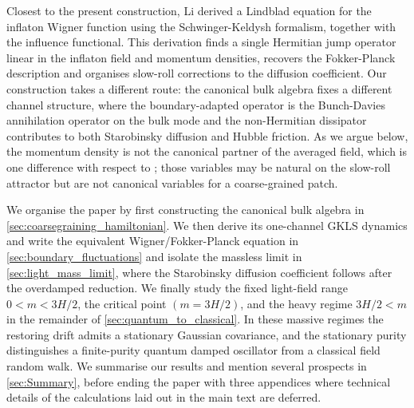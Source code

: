 \documentclass{article}
\numberwithin{equation}{section}
\begin{document}
	
	Closest to the present construction, Li \cite{Li2026Stochastic,Li2026lwl} derived a Lindblad equation for the inflaton Wigner function using the Schwinger-Keldysh formalism, together with the influence functional. This derivation finds a single Hermitian jump operator linear in the inflaton field and momentum densities, recovers the Fokker-Planck description and organises slow-roll corrections to the diffusion coefficient. Our construction takes a different route: the canonical bulk algebra fixes a different channel structure, where the boundary-adapted operator is the Bunch-Davies annihilation operator on the bulk mode and the non-Hermitian dissipator contributes to both Starobinsky diffusion and Hubble friction. As we argue below, the momentum density is not the canonical partner of the averaged field, which is one difference with respect to \cite{Li2026Stochastic,Li2026lwl}; those variables may be natural on the slow-roll attractor but are not canonical variables for a coarse-grained patch.

	We organise the paper by first constructing the canonical bulk algebra in \cref{sec:coarsegraining_hamiltonian}. We then derive its one-channel GKLS dynamics and write the equivalent Wigner/Fokker-Planck equation in \cref{sec:boundary_fluctuations} and isolate the massless limit in \cref{sec:light_mass_limit}, where the Starobinsky diffusion coefficient follows after the overdamped reduction. We finally study the fixed light-field range \(0<m<3H/2\), the critical point $(m=3H/2)$, and the heavy regime \(3H/2<m\) in the remainder of \cref{sec:quantum_to_classical}. In these massive regimes the restoring drift admits a stationary Gaussian covariance, and the stationary purity distinguishes a finite-purity quantum damped oscillator from a classical field random walk. We summarise our results and mention several prospects in \cref{sec:Summary}, before ending the paper with three appendices where technical details of the calculations laid out in the main text are deferred.
\end{document}
